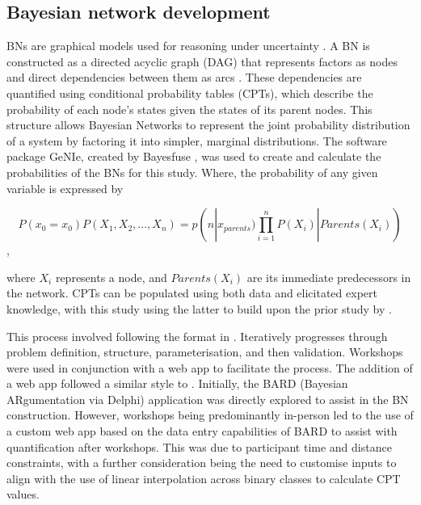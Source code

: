 \documentclass{article}
\begin{document}
\subsection{Bayesian network development}
BNs are graphical models used for reasoning under uncertainty \cite{pearl1986fusion}. A BN is constructed as a directed acyclic graph (DAG) that represents factors as nodes and direct dependencies between them as arcs \cite{pearlbayesian}. These dependencies are quantified using conditional probability tables (CPTs), which describe the probability of each node's states given the states of its parent nodes. This structure allows Bayesian Networks to represent the joint probability distribution of a system by factoring it into simpler, marginal distributions. The software package GeNIe, created by Bayesfuse \cite{bayesfusion2024genie}, was used to create and calculate the probabilities of the BNs for this study. Where, the probability of any given variable is expressed by

$$P(x_{0}=x_{0})P(X_{1}, X_{2}, ... , X_{n}) = p(n|x_{parents}) \prod^{n}_{i=1} P(X_{i}) | Parents (X_{i})) $$,

where $X_{i}$ represents a node, and $Parents(X_{i})$ are its immediate predecessors in the network. CPTs can be populated using both data and elicitated expert knowledge, with this study using the latter to build upon the prior study by \cite{environmental_bn}.

This process involved following the format in \cite{korb2010bayesian, pourret2008bayesian}. Iteratively progresses through problem definition, structure, parameterisation, and then validation. Workshops were used in conjunction with a web app to facilitate the process. The addition of a web app followed a similar style to \cite{nyberg2022bard}. Initially, the BARD (Bayesian ARgumentation via Delphi) application was directly explored to assist in the BN construction. However, workshops being predominantly in-person led to the use of a custom web app based on the data entry capabilities of BARD to assist with quantification after workshops. This was due to participant time and distance constraints, with a further consideration being the need to customise inputs to align with the use of linear interpolation across binary classes to calculate CPT values.
\end{document}
